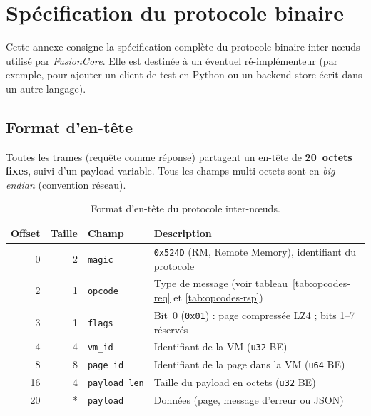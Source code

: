 \chapter{Spécification du protocole binaire}
\label{annexe:protocole}

Cette annexe consigne la spécification complète du protocole binaire inter-nœuds utilisé par \emph{FusionCore}. Elle est destinée à un éventuel ré-implémenteur (par exemple, pour ajouter un client de test en Python ou un backend store écrit dans un autre langage).

\section{Format d'en-tête}

Toutes les trames (requête comme réponse) partagent un en-tête de \textbf{20~octets fixes}, suivi d'un payload variable. Tous les champs multi-octets sont en \emph{big-endian} (convention réseau).

\begin{table}[H]
\centering
\small
\caption{Format d'en-tête du protocole inter-nœuds.}
\begin{tabular}{rrlp{7cm}}
\toprule
\textbf{Offset} & \textbf{Taille} & \textbf{Champ} & \textbf{Description} \\
\midrule
0  & 2 & \texttt{magic}        & \texttt{0x524D} (\og{}RM\fg{}, Remote Memory), identifiant du protocole \\
2  & 1 & \texttt{opcode}       & Type de message (voir tableau~\ref{tab:opcodes-req} et \ref{tab:opcodes-rsp}) \\
3  & 1 & \texttt{flags}        & Bit~0 (\texttt{0x01}) : page compressée LZ4 ; bits 1--7 réservés \\
4  & 4 & \texttt{vm\_id}       & Identifiant de la VM (\texttt{u32} BE) \\
8  & 8 & \texttt{page\_id}     & Identifiant de la page dans la VM (\texttt{u64} BE) \\
16 & 4 & \texttt{payload\_len} & Taille du payload en octets (\texttt{u32} BE) \\
20 & * & \texttt{payload}      & Données (page, message d'erreur ou JSON) \\
\bottomrule
\end{tabular}

\end{table}

